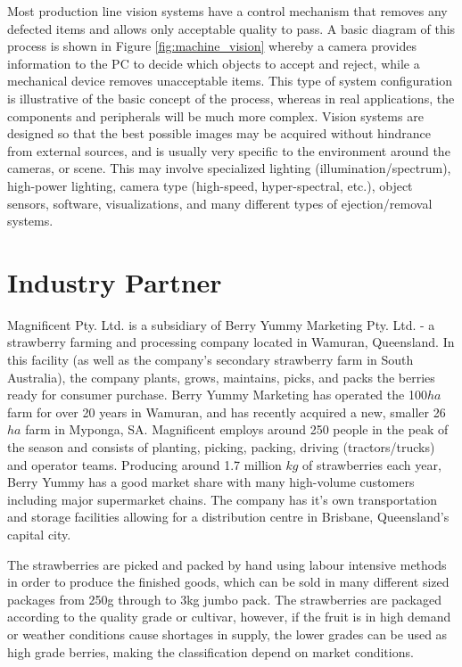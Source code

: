 \documentclass[fleqn,twoside,12pt]{report}
\begin{document}
Most production line vision systems have a control mechanism that removes any defected items and allows only acceptable quality to pass. A basic diagram of this process is shown in Figure \ref{fig:machine_vision} whereby a camera provides information to the PC to decide which objects to accept and reject, while a mechanical device removes unacceptable items. This type of system configuration is illustrative of the basic concept of the process, whereas in real applications, the components and peripherals will be much more complex. Vision systems are designed so that the best possible images may be acquired without hindrance from external sources, and is usually very specific to the environment around the cameras, or scene. This may involve specialized lighting (illumination/spectrum), high-power lighting, camera type (high-speed, hyper-spectral, etc.), object sensors, software, visualizations, and many different types of ejection/removal systems.



\section{Industry Partner}

Magnificent Pty. Ltd. is a subsidiary of Berry Yummy Marketing Pty. Ltd. - a strawberry farming and processing company located in Wamuran, Queensland. In this facility (as well as the company's secondary strawberry farm in South Australia), the company plants, grows, maintains, picks, and packs the berries ready for consumer purchase. Berry Yummy Marketing has operated the 100$ha$ farm for over 20 years in Wamuran, and has recently acquired a new, smaller 26$ha$ farm in Myponga, SA. Magnificent employs around 250 people in the peak of the season and consists of planting, picking, packing, driving (tractors/trucks) and operator teams. Producing around 1.7 million $kg$ of strawberries each year, Berry Yummy has a good market share with many high-volume customers including major supermarket chains. The company has it's own transportation and storage facilities allowing for a distribution centre in Brisbane, Queensland's capital city. 

The strawberries are picked and packed by hand using labour intensive methods in order to produce the finished goods, which can be sold in many different sized packages from 250g through to 3kg jumbo pack. The strawberries are packaged according to the quality grade or cultivar, however, if the fruit is in high demand or weather conditions cause shortages in supply, the lower grades can be used as high grade berries, making the classification depend on market conditions.
\end{document}
